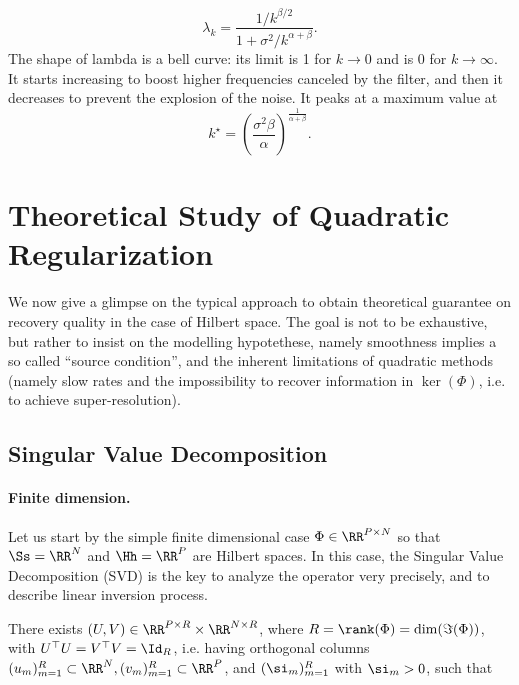 $$
	\lambda_k = \frac{ 1/ k^{\beta/2} }{  1 + \sigma^2 / k^{\alpha+\beta}  }.
$$
The shape of lambda is a bell curve: its limit is 1 for $k \to 0$ and is 0 for $k \to \infty$.
It starts increasing to boost higher frequencies canceled by the filter, and then it decreases to prevent the explosion of the noise. 
It peaks at a maximum value at 
$$
	k^\star = \left( \frac{\sigma^2 \beta}{\alpha} \right)^{\frac{1}{\alpha + \beta}}.
$$


\section{Theoretical Study of Quadratic Regularization}

We now give a glimpse on the typical approach to obtain theoretical guarantee on recovery quality in the case of Hilbert space. The goal is not to be exhaustive, but rather to insist on the modelling hypotethese, namely smoothness implies a so called ``source condition'', and the inherent limitations of quadratic methods (namely slow rates and the impossibility to recover information in $\ker(\Phi)$, i.e. to achieve super-resolution). 

\subsection{Singular Value Decomposition}


\paragraph{Finite dimension.}

Let us start by the simple finite dimensional case $\Phi \in \RR^{P \times N}$ so that $\Ss=\RR^N$ and $\Hh=\RR^P$ are Hilbert spaces.
%
In this case, the Singular Value Decomposition (SVD) is the key to analyze the operator very precisely, and to describe linear inversion process.  

\begin{prop}[SVD]\label{prop-svd}
	There exists $(U,V) \in \RR^{P \times R} \times \RR^{N \times R}$, where $R=\rank(\Phi)=\dim(\Im(\Phi))$, with $U^\top U=V^\top V=\Id_R$, i.e. having orthogonal columns $(u_m)_{m=1}^R \subset \RR^N, (v_m)_{m=1}^R \subset \RR^P$,  and $(\si_m)_{m=1}^R$ with $\si_m>0$, such that
\end{prop}

